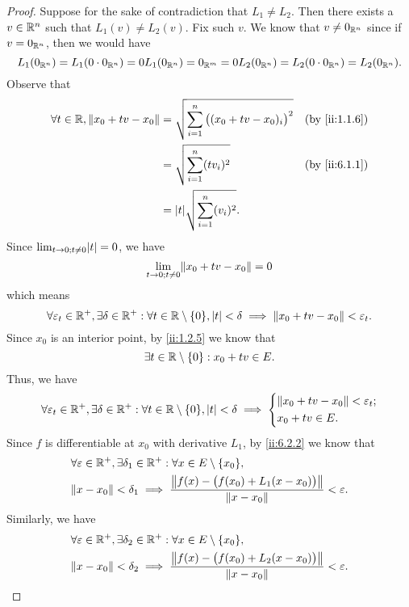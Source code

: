 \begin{proof}
  Suppose for the sake of contradiction that \(L_1 \neq L_2\).
  Then there exists a \(v \in \mathbb{R}^n\) such that \(L_1(v) \neq L_2(v)\).
  Fix such \(v\).
  We know that \(v \neq 0_{\mathbb{R}^n}\) since if \(v = 0_{\mathbb{R}^n}\), then we would have
  \[
    L_1(0_{\mathbb{R}^n}) = L_1(0 \cdot 0_{\mathbb{R}^n}) = 0 L_1(0_{\mathbb{R}^n}) = 0_{\mathbb{R}^m} = 0 L_2(0_{\mathbb{R}^n}) = L_2(0 \cdot 0_{\mathbb{R}^n}) = L_2(0_{\mathbb{R}^n}).
  \]
  Observe that
  \begin{align*}
    \forall t \in \R, \norm*{x_0 + tv - x_0} & = \sqrt{\sum_{i = 1}^n \big((x_0 + tv - x_0)_i\big)^2} &  & \by{ii:1.1.6} \\
                                             & = \sqrt{\sum_{i = 1}^n (t v_i)^2}                      &  & \by{ii:6.1.1} \\
                                             & = \abs{t} \sqrt{\sum_{i = 1}^n (v_i)^2}.
  \end{align*}
  Since \(\lim_{t \to 0 ; t \neq 0} \abs{t} = 0\), we have
  \[
    \lim_{t \to 0 ; t \neq 0} \norm*{x_0 + tv - x_0} = 0
  \]
  which means
  \[
    \forall \varepsilon_t \in \R^+, \exists \delta \in \R^+ : \forall t \in \R \setminus \set{0}, \abs{t} < \delta \implies \norm*{x_0 + tv - x_0} < \varepsilon_t.
  \]
  Since \(x_0\) is an interior point, by \cref{ii:1.2.5} we know that
  \[
    \exists t \in \mathbb{R} \setminus \left\lbrace0\right\rbrace : x_0 + tv \in E.
  \]
  Thus, we have
  \[
    \forall \varepsilon_t \in \R^+, \exists \delta \in \R^+ : \forall t \in \R \setminus \set{0}, \abs{t} < \delta \implies \begin{dcases}
      \norm*{x_0 + tv - x_0} < \varepsilon_t; \\
      x_0 + tv \in E.
    \end{dcases}
  \]
  Since \(f\) is differentiable at \(x_0\) with derivative \(L_1\), by \cref{ii:6.2.2} we know that
  \begin{align*}
     & \forall \varepsilon \in \R^+, \exists \delta_1 \in \R^+ : \forall x \in E \setminus \set{x_0},                             \\
     & \norm*{x - x_0} < \delta_1 \implies \dfrac{\norm*{f(x) - \big(f(x_0) + L_1(x - x_0)\big)}}{\norm*{x - x_0}} < \varepsilon.
  \end{align*}
  Similarly, we have
  \begin{align*}
     & \forall \varepsilon \in \R^+, \exists \delta_2 \in \R^+ : \forall x \in E \setminus \set{x_0},                             \\
     & \norm*{x - x_0} < \delta_2 \implies \dfrac{\norm*{f(x) - \big(f(x_0) + L_2(x - x_0)\big)}}{\norm*{x - x_0}} < \varepsilon.

\end{align*}
\end{proof}
